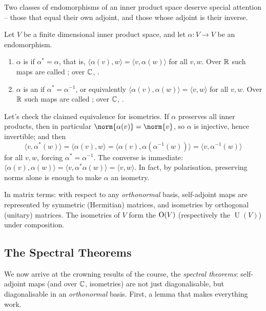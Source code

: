 \documentclass[a4paper]{scrartcl}
\begin{document}
Two classes of endomorphisms of an inner product space deserve special attention -- those that equal their own adjoint, and those whose adjoint is their inverse.

\begin{definition}
    Let $V$ be a finite dimensional inner product space, and let $\alpha: V \rightarrow V$ be an endomorphism.
    \begin{enumerate}[label=(\roman*)]
        \item $\alpha$ is  if $\alpha^* = \alpha$, that is, $\langle \alpha(v), w \rangle = \langle v, \alpha(w)\rangle$ for all $v, w$. Over $\mathbb{R}$ such maps are called ; over $\mathbb{C}$, .
        \item $\alpha$ is an  if $\alpha^* = \alpha^{-1}$, or equivalently $\langle \alpha(v), \alpha(w)\rangle = \langle v, w \rangle$ for all $v, w$. Over $\mathbb{R}$ such maps are called ; over $\mathbb{C}$, .
    \end{enumerate}
\end{definition}

Let's check the claimed equivalence for isometries. If $\alpha$ preserves all inner products, then in particular $\norm{\alpha(v)} = \norm{v}$, so $\alpha$ is injective, hence invertible; and then
$$
\langle v, \alpha^*(w)\rangle = \langle \alpha(v), w \rangle = \langle \alpha(v), \alpha(\alpha^{-1}(w))\rangle = \langle v, \alpha^{-1}(w)\rangle
$$
for all $v, w$, forcing $\alpha^* = \alpha^{-1}$. The converse is immediate: $\langle \alpha(v), \alpha(w)\rangle = \langle v, \alpha^*\alpha(w)\rangle = \langle v, w \rangle$. In fact, by polarisation, preserving norms alone is enough to make $\alpha$ an isometry.

In matrix terms: with respect to any \emph{orthonormal} basis, self-adjoint maps are represented by symmetric (Hermitian) matrices, and isometries by orthogonal (unitary) matrices. The isometries of $V$ form the  $\operatorname{O}(V)$ (respectively the  $\operatorname{U}(V)$) under composition.

\subsection{The Spectral Theorems}

We now arrive at the crowning results of the course, the \emph{spectral theorems}: self-adjoint maps (and over $\mathbb{C}$, isometries) are not just diagonalisable, but diagonalisable in an \emph{orthonormal} basis. First, a lemma that makes everything work.
\end{document}
